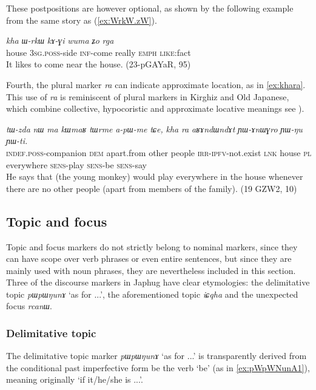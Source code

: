 \documentclass[oneside,a4paper,11pt]{article}
\newcommand{\ipa}[1]{\mbox{\phon\textit{#1}}} %
\begin{document}
These postpositions are however optional, as shown by the following example from the same story as (\ref{ex:WrkW.zW}).

\begin{exe}
\ex \label{ex:kha.WrkW}
\gll
\ipa{kha} 	\ipa{ɯ-rkɯ} 	\ipa{kɤ-ɣi} 	\ipa{wuma} 	\ipa{ʑo} 	\ipa{rga} \\
house \textsc{3sg.poss}-side  \textsc{inf}-come really \textsc{emph} \textsc{like}:fact \\
\glt It likes to come near the house. (23-pGAYaR, 95)
\end{exe}

Fourth, the plural marker \ipa{ra} can indicate approximate location, as in \ref{ex:khara}. This use of \ipa{ra} is reminiscent of plural markers in Kirghiz and Old Japanese, which combine collective, hypocoristic and approximate locative meanings see \citealt[195]{antonov07ra}).

\begin{exe}
\ex \label{ex:khara}
\gll
\ipa{tɯ-zda} 	\ipa{nɯ} 	\ipa{ma} 	\ipa{kɯmaʁ} 	\ipa{tɯrme} 	\ipa{a-pɯ-me} 	\ipa{tɕe,} 	\ipa{kha} 	\ipa{ra} 	\ipa{aʁɤndɯndɤt} \ipa{ɲɯ-ɤnɯɣro} 	\ipa{ɲɯ-ŋu} 	\ipa{ɲɯ-ti.} \\
\textsc{indef.poss}-companion \textsc{dem} apart.from other people \textsc{irr-ipfv}-not.exist \textsc{lnk} house \textsc{pl} everywhere \textsc{sens}-play \textsc{sens}-be \textsc{sens}-say \\
\glt He says that (the young monkey) would play everywhere in the house whenever there are no other people (apart from members of the family). (19 GZW2, 10)
\end{exe}


   \subsection{Topic and focus} \label{sec:topic}
Topic and focus markers do not strictly belong to nominal markers, since they can have scope over verb phrases or even entire sentences, but since they are mainly used with noun phrases, they are nevertheless included in this section. Three of the discourse markers in Japhug have clear etymologies: the delimitative topic \ipa{pɯpɯŋunɤ} `as for ...', the aforementioned topic \ipa{iɕqha} and the unexpected focus \ipa{rcanɯ}.

  \subsubsection{Delimitative topic}
The delimitative topic marker \ipa{pɯpɯŋunɤ} `as for ...' is transparently derived from the conditional past imperfective form be the verb `be' (as in \ref{ex:pWpWNunA1}), meaning originally `if it/he/she is ...'.
\end{document}
